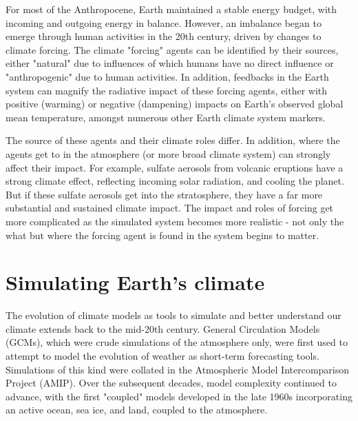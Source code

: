 \documentclass[gmd, preprint]{copernicus}
\begin{document}
For most of the Anthropocene, Earth maintained a stable energy budget, with incoming and outgoing energy in balance. However, an imbalance began to emerge through human activities in the 20th century, driven by changes to climate forcing. The climate "forcing" agents can be identified by their sources, either "natural" due to influences of which humans have no direct influence or "anthropogenic" due to human activities. In addition, feedbacks in the Earth system can magnify the radiative impact of these forcing agents, either with positive (warming) or negative (dampening) impacts on Earth's observed global mean temperature, amongst numerous other Earth climate system markers.

The source of these agents and their climate roles differ. In addition, where the agents get to in the atmosphere (or more broad climate system) can strongly affect their impact. For example, sulfate aerosols from volcanic eruptions have a strong climate effect, reflecting incoming solar radiation, and cooling the planet. But if these sulfate aerosols get into the stratosphere, they have a far more substantial and sustained climate impact. The impact and roles of forcing get more complicated as the simulated system becomes more realistic - not only the what but where the forcing agent is found in the system begins to matter.


\section{Simulating Earth’s climate}

The evolution of climate models as tools to simulate and better understand our climate extends back to the mid-20th century. General Circulation Models (GCMs), which were crude simulations of the atmosphere only, were first used to attempt to model the evolution of weather as short-term forecasting tools. Simulations of this kind were collated in the Atmospheric Model Intercomparison Project (AMIP). Over the subsequent decades, model complexity continued to advance, with the first "coupled" models developed in the late 1960s incorporating an active ocean, sea ice, and land, coupled to the atmosphere.
\end{document}
